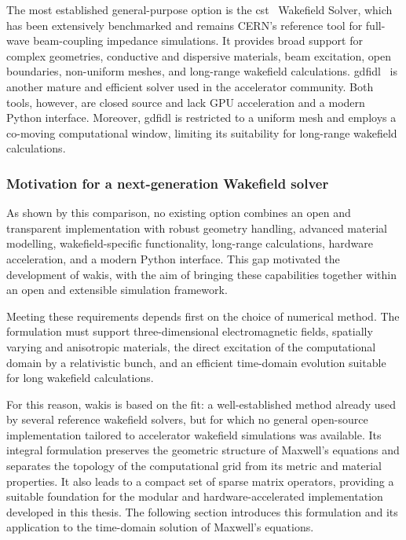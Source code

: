 The most established general-purpose option is the \gls{cst}~\cite{cst_studio_suite} Wakefield Solver, which has been extensively benchmarked and remains CERN's reference tool for full-wave beam-coupling impedance simulations. It provides broad support for complex geometries, conductive and dispersive materials, beam excitation, open boundaries, non-uniform meshes, and long-range wakefield calculations.
\gls{gdfidl}~\cite{bruns_gdfidl_1997} is another mature and efficient solver used in the accelerator
community. Both tools, however, are closed source and lack GPU acceleration and a modern Python interface. Moreover, \gls{gdfidl} is restricted to a uniform mesh and employs a co-moving computational window, limiting its suitability for long-range wakefield calculations.

\subsubsection{Motivation for a next-generation Wakefield solver}

As shown by this comparison, no existing option combines an open and transparent implementation with robust geometry handling, advanced material modelling, wakefield-specific functionality, long-range calculations, hardware acceleration, and a modern Python interface. This gap motivated the development of \gls{wakis}, with the aim of bringing these capabilities together within an open and extensible simulation framework.

Meeting these requirements depends first on the choice of numerical method. The formulation must support three-dimensional electromagnetic fields, spatially varying and anisotropic materials, the direct excitation of the computational domain by a relativistic bunch, and an efficient time-domain evolution suitable for long wakefield calculations. 

For this reason, \gls{wakis} is based on the \gls{fit}: a well-established method already used by several reference wakefield solvers, but for which no general open-source implementation tailored to accelerator wakefield simulations was available. Its integral formulation preserves the geometric structure of Maxwell's equations and separates the topology of the computational grid from its metric and material properties. It also leads to a compact set of sparse matrix operators, providing a suitable foundation for the modular and hardware-accelerated implementation developed in this thesis. The following section introduces this formulation and
its application to the time-domain solution of Maxwell's equations.




